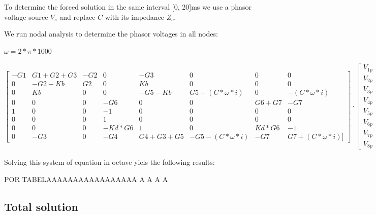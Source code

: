 To determine the forced solution in the same interval [0, 20]ms we use a phasor voltage source $V_s$ and replace $C$ with its impedance $Z_c$.

We run nodal analysis to determine the phasor voltages in all nodes:

 $\omega=2*\pi*1000$
 
  \begin{equation}\label{eq:matrixeq3}
\begin{bmatrix}
-G1 & G1+G2+G3 & -G2 & 0 & -G3 & 0 & 0 & 0\\
0 & -G2-Kb & G2 & 0 & Kb & 0 & 0 & 0\\
0 & Kb & 0 & 0 & -G5-Kb & G5+(C*\omega*i) & 0 & -(C*\omega*i)\\
0 & 0 & 0 & -G6 & 0 & 0 & G6+G7 & -G7\\
1 & 0 & 0 & -1 & 0 & 0 & 0 & 0\\
0 & 0 & 0 & 1 & 0 & 0 & 0 & 0\\
0 & 0 & 0 & -Kd*G6 & 1 & 0 & Kd*G6 & -1\\
0 & -G3 & 0 & -G4 & G4+G3+G5 & -G5-(C*\omega*i) & -G7 & G7+(C*\omega*i)]
\end{bmatrix}
\cdot
\begin{bmatrix}
V_{1p} \\
V_{2p} \\
V_{3p} \\
V_{4p} \\
V_{5p} \\
V_{6p} \\
V_{7p} \\
V_{8p} 
    \end{bmatrix}
=
    \begin{bmatrix}
0 \\
0 \\
0 \\
0 \\
1 \\
0 \\
0 \\
0 
    \end{bmatrix}
  \end{equation}



Solving this system of equation in octave yiels the following results:

POR TABELAAAAAAAAAAAAAAAAA
A
A
A
A
  
  

\subsection{Total solution}

